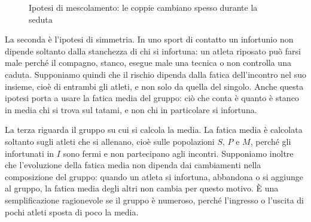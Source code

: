 \begin{figure}[ht]
    \centering
    \caption{Ipotesi di mescolamento: le coppie cambiano spesso durante la seduta}\label{fig:mescolamento}
\end{figure}


La seconda è l'ipotesi di simmetria. In uno sport di contatto un infortunio non dipende soltanto dalla stanchezza di chi si infortuna: un atleta riposato può farsi male perché il compagno, stanco, esegue male una tecnica o non controlla una caduta. Supponiamo quindi che il rischio dipenda dalla fatica dell'incontro nel suo insieme, cioè di entrambi gli atleti, e non solo da quella del singolo. Anche questa ipotesi porta a usare la fatica media del gruppo: ciò che conta è quanto è stanco in media chi si trova sul tatami, e non chi in particolare si infortuna. \par

La terza riguarda il gruppo su cui si calcola la media. La fatica media è calcolata soltanto sugli atleti che si allenano, cioè sulle popolazioni $S$, $P$ e $M$, perché gli infortunati in $I$ sono fermi e non partecipano agli incontri. Supponiamo inoltre che l'evoluzione della fatica media non dipenda dai cambiamenti nella composizione del gruppo: quando un atleta si infortuna, abbandona o si aggiunge al gruppo, la fatica media degli altri non cambia per questo motivo. È una semplificazione ragionevole se il gruppo è numeroso, perché l'ingresso o l'uscita di pochi atleti sposta di poco la media. \par

